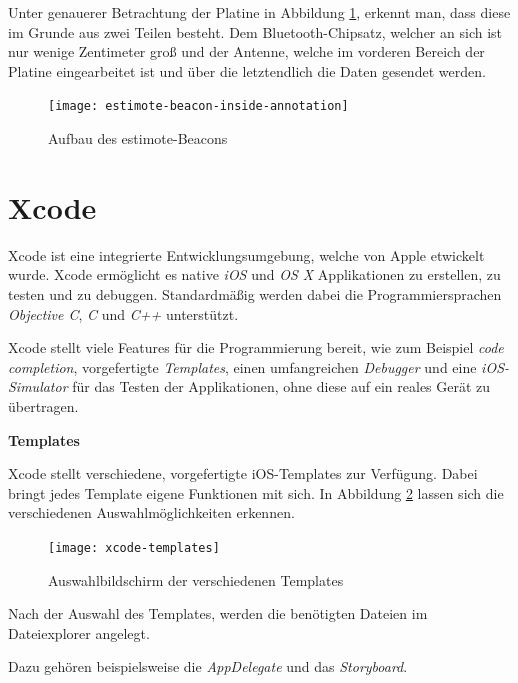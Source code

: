 Unter genauerer Betrachtung der Platine in Abbildung \ref{estimote-beacon-inside-annotations}, erkennt man, dass diese im Grunde aus zwei Teilen besteht.
Dem Bluetooth-Chipsatz, welcher an sich ist nur wenige Zentimeter groß und der Antenne, welche im vorderen Bereich der Platine eingearbeitet ist und über die letztendlich die Daten gesendet werden.

\begin{figure}[h!]
	\centering
	\texttt{[image: estimote-beacon-inside-annotation]}
	\caption{Aufbau des estimote-Beacons}
	\label{estimote-beacon-inside-annotations}
\end{figure}



\section{Xcode}
\label{sec:tools:xcode}
Xcode ist eine integrierte Entwicklungsumgebung, welche von Apple etwickelt wurde. Xcode ermöglicht es native \emph{iOS} und \emph{OS X} Applikationen zu erstellen, zu testen und zu debuggen.
Standardmäßig werden dabei die Programmiersprachen \emph{Objective C}, \emph{C} und \emph{C++} unterstützt.

Xcode stellt viele Features für die Programmierung bereit, wie zum Beispiel \emph{code completion}, vorgefertigte \emph{Templates}, einen umfangreichen \emph{Debugger} und eine \emph{iOS-Simulator} für das Testen der Applikationen, ohne diese auf ein reales Gerät zu übertragen.


\textbf{Templates}

Xcode stellt verschiedene, vorgefertigte iOS-Templates zur Verfügung. 
Dabei bringt jedes Template eigene Funktionen mit sich. In Abbildung \ref{xcode-templates} lassen sich die verschiedenen Auswahlmöglichkeiten erkennen.

\begin{figure}[htb!]
		\centering
	\texttt{[image: xcode-templates]}
	\caption{Auswahlbildschirm der verschiedenen Templates}
	\label{xcode-templates}
\end{figure}

Nach der Auswahl des Templates, werden die benötigten Dateien im Dateiexplorer angelegt.



Dazu gehören beispielsweise die \emph{AppDelegate} und das \emph{Storyboard}.

